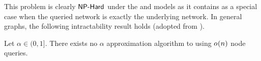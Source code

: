 This problem is clearly $\textsf{NP-Hard}$ under the \ltmodel{} and \icmodel{} models as it contains \infmax{} as a special case when the 
queried network is exactly the underlying network. 
In general graphs, the following intractability result holds (adopted from \cite{wilder2018maximizing,eckles2019seeding}). 

\begin{theorem}
    Let $\alpha \in (0, 1]$. There exists no $\alpha$ approximation algorithm to \expim{} using $o_{} \! \left( n \right)$ node queries. 
    \label{thm:intractability}
\end{theorem}
